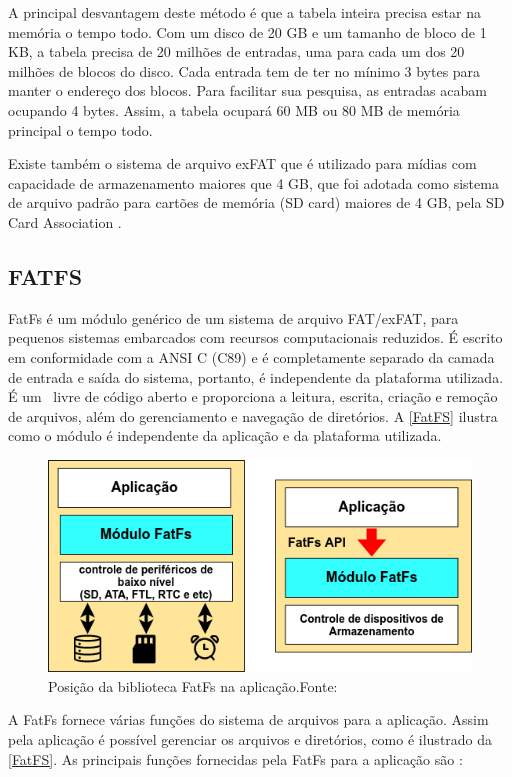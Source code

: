A principal desvantagem deste método é que a tabela inteira precisa estar na memória o tempo todo. Com um disco de 20 GB e um tamanho de bloco de 1 KB, a tabela precisa de 20 milhões de entradas, uma para cada um dos 20 milhões de blocos do disco. Cada entrada tem de ter no mínimo 3 bytes para manter o endereço dos blocos. Para facilitar sua pesquisa, as entradas acabam ocupando 4 bytes. Assim, a tabela ocupará 60 MB ou 80 MB de memória principal o tempo todo.

Existe também o sistema de arquivo exFAT que é utilizado para mídias com capacidade de armazenamento maiores que 4 GB, que foi adotada como sistema de arquivo padrão para cartões de memória (SD card) maiores de 4 GB, pela SD Card Association \cite{SDCARD}.

\subsection{FATFS}

FatFs é um módulo genérico de um sistema de arquivo FAT/exFAT, para pequenos sistemas embarcados com recursos computacionais reduzidos. É escrito em conformidade com a ANSI C (C89) e é completamente separado da camada de entrada e saída do sistema, portanto, é independente da plataforma utilizada. É um \software\ livre de código aberto e proporciona a leitura, escrita, criação e remoção de arquivos, além do gerenciamento e navegação de diretórios. A \autoref{FatFS} ilustra como o módulo é independente da aplicação e da plataforma utilizada.

\begin{figure}[H]
    \scriptsize
     \centering
     \includegraphics[scale=0.6]{dados/figuras/fatfs.png}
     \caption{Posição da biblioteca FatFs na aplicação.\newline  Fonte:\cite{FATFS}}
     \label{FatFS}
\end{figure}
A FatFs fornece várias funções do sistema de arquivos para a aplicação.
Assim pela aplicação é possível gerenciar os arquivos e diretórios, como é ilustrado da \autoref{FatFS}. As principais funções fornecidas pela FatFs para a aplicação são \cite{FATFS}:

